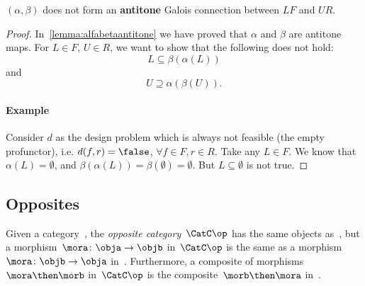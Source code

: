 

\begin{lemma}
  $(\alpha, \beta)$ does not form an \textbf{antitone} Galois connection between $LF$ and $UR$.
\end{lemma}
\begin{proof}
  In~\cref{lemma:alfabetaantitone} we have proved that $\alpha$ and $\beta$ are antitone maps. For $L\in F$, $U\in R$, we want to show that the following does not hold:
  \begin{equation}
    \label{eq:alfabetafirst}
    L\subseteq \beta(\alpha(L))
  \end{equation}
  and
  \begin{equation}
    \label{eq:alfabetasec}
    U\supseteq \alpha(\beta(U)).
  \end{equation}

  \paragraph{Example} Consider $d$ as the design problem which is always not feasible (the empty profunctor), i.e. $d(f,r)=\false$, $\forall f\in F,r\in R$. Take any $L\in F$. We know that $\alpha(L)=\emptyset$, and $\beta(\alpha(L))=\beta(\emptyset)=\emptyset$. But $L\subseteq \emptyset$ is not true.

\end{proof}

\subsection{Opposites}

\begin{ctdefinition}
  \label{def:oppositecat}
  Given a category~\CatC, the \emph{opposite category}~$\CatC\op$ has the same objects as~\CatC, but a morphism~$\mora\colon \obja\to \objb$ in~$\CatC\op$ is the same as a morphism~$\mora\colon \objb\to \obja$ in~\CatC. Furthermore, a composite of morphisms~$\mora \then \morb$ in~$\CatC\op$ is the composite~$\morb\then \mora$ in~\CatC.
\end{ctdefinition}

